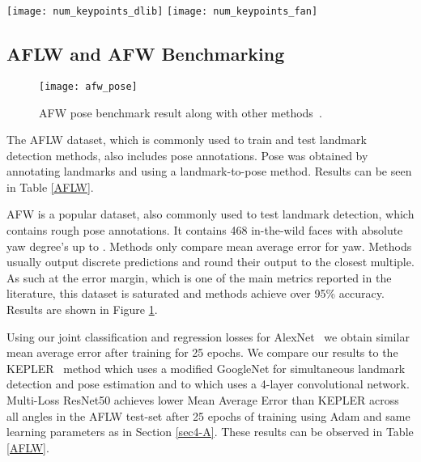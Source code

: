 \documentclass[10pt,twocolumn,letterpaper]{article}
\begin{document}
\begin{figure*}[t]
\begin{center}
   \texttt{[image: num\_keypoints\_dlib]}
   \texttt{[image: num\_keypoints\_fan]}
\end{center}
   \caption{Using estimated 2D landmark points, this experiment shows the 3D pose estimation error depending on how many facial keypoints are used.}
   \label{estimated_2to3}
\end{figure*}

\subsection{AFLW and AFW Benchmarking}\label{sec4-E}
\begin{figure}[t]
\begin{center}
   \texttt{[image: afw\_pose]}
\end{center}
   \caption{AFW pose benchmark result along with other methods~\cite{allinone,ranjan2016hyperface,KEPLER,zhu2012face}.}
   \label{afw_pose}
\end{figure}
The AFLW dataset, which is commonly used to train and test landmark detection methods, also includes pose annotations. Pose was obtained by annotating landmarks and using a landmark-to-pose method. Results can be seen in Table \ref{AFLW}.

AFW is a popular dataset, also commonly used to test landmark detection, which contains rough pose annotations. It contains 468 in-the-wild faces with absolute yaw degree's up to . Methods only compare mean average error for yaw. Methods usually output discrete predictions and round their output to the closest  multiple. As such at the  error margin, which is one of the main metrics reported in the literature, this dataset is saturated and methods achieve over 95\% accuracy. Results are shown in Figure \ref{afw_pose}.

Using our joint classification and regression losses for AlexNet~\cite{krizhevsky2012imagenet} we obtain similar mean average error after training for 25 epochs. We compare our results to the KEPLER~\cite{KEPLER} method which uses a modified GoogleNet for simultaneous landmark detection and pose estimation and to \cite{patacchiola2017head} which uses a 4-layer convolutional network. Multi-Loss ResNet50 achieves lower Mean Average Error than KEPLER across all angles in the AFLW test-set after 25 epochs of training using Adam and same learning parameters as in Section \ref{sec4-A}. These results can be observed in Table \ref{AFLW}.
\end{document}
